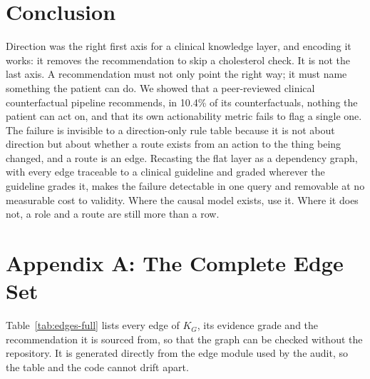 \documentclass[conference]{IEEEtran}
\begin{document}
\section{Conclusion}
Direction was the right first axis for a clinical knowledge layer, and encoding it works: it removes the recommendation to skip a cholesterol check. It is not the last axis. A recommendation must not only point the right way; it must name something the patient can do. We showed that a peer-reviewed clinical counterfactual pipeline recommends, in 10.4\% of its counterfactuals, nothing the patient can act on, and that its own actionability metric fails to flag a single one. The failure is invisible to a direction-only rule table because it is not about direction but about whether a route exists from an action to the thing being changed, and a route is an edge. Recasting the flat layer as a dependency graph, with every edge traceable to a clinical guideline and graded wherever the guideline grades it, makes the failure detectable in one query and removable at no measurable cost to validity. Where the causal model exists, use it. Where it does not, a role and a route are still more than a row.


\section*{Appendix A: The Complete Edge Set}
Table~\ref{tab:edges-full} lists every edge of $K_G$, its evidence grade and the recommendation it is sourced from, so that the graph can be checked without the repository. It is generated directly from the edge module used by the audit, so the table and the code cannot drift apart.
\end{document}
